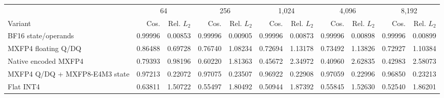 \begin{tabular}{lrrrrrrrrrr}
\toprule
& \multicolumn{2}{c}{64} & \multicolumn{2}{c}{256} & \multicolumn{2}{c}{1{,}024} & \multicolumn{2}{c}{4{,}096} & \multicolumn{2}{c}{8{,}192} \\
Variant & Cos. & Rel. $L_2$ & Cos. & Rel. $L_2$ & Cos. & Rel. $L_2$ & Cos. & Rel. $L_2$ & Cos. & Rel. $L_2$ \\
\midrule
BF16 state/operands & 0.99996 & 0.00853 & 0.99996 & 0.00905 & 0.99996 & 0.00873 & 0.99996 & 0.00898 & 0.99996 & 0.00899 \\
MXFP4 floating Q/DQ & 0.86488 & 0.69728 & 0.76740 & 1.08234 & 0.72694 & 1.13178 & 0.73492 & 1.13826 & 0.72927 & 1.10384 \\
Native encoded MXFP4 & 0.79393 & 0.98196 & 0.60220 & 1.81363 & 0.45672 & 2.34972 & 0.40960 & 2.62835 & 0.42983 & 2.58073 \\
MXFP4 Q/DQ + MXFP8-E4M3 state & 0.97213 & 0.22072 & 0.97075 & 0.23507 & 0.96922 & 0.22908 & 0.97059 & 0.22996 & 0.96850 & 0.23213 \\
Flat INT4 & 0.63811 & 1.50722 & 0.55497 & 1.80492 & 0.50944 & 1.87392 & 0.55845 & 1.52630 & 0.52540 & 1.86201 \\
\bottomrule
\end{tabular}
